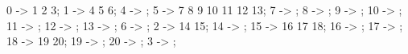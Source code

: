  {
    0 -> {1 2 3};
    1 -> {4 5 6};
    4 -> {};
    5 -> {7 8 9 10 11 12 13};
    7 -> {};
    8 -> {};
    9 -> {};
    10 -> {};
    11 -> {};
    12 -> {};
    13 -> {};
    6 -> {};
    2 -> {14 15};
    14 -> {};
    15 -> {16 17 18};
    16 -> {};
    17 -> {};
    18 -> {19 20};
    19 -> {};
    20 -> {};
    3 -> {};
}